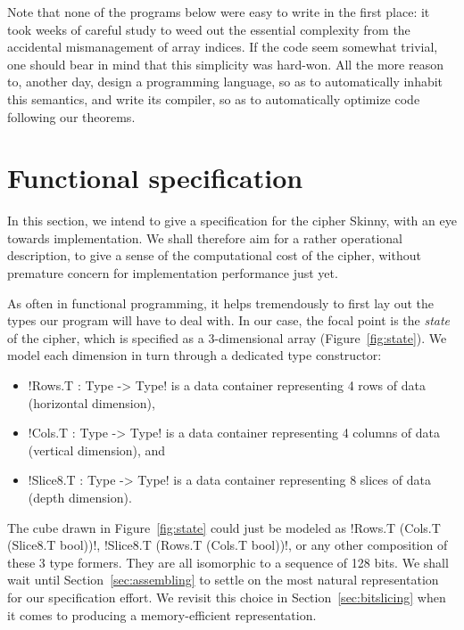 \documentclass[draft,english]{jflart}
\begin{document}
Note that none of the programs below were easy to write in the first
place: it took weeks of careful study to weed out the essential
complexity from the accidental mismanagement of array indices. If the
code seem somewhat trivial, one should bear in mind that this
simplicity was hard-won. All the more reason to, another day, design a
programming language, so as to automatically inhabit this semantics,
and write its compiler, so as to automatically optimize code following
our theorems.

\section{Functional specification}
\label{sec:spec}


In this section, we intend to give a specification for the cipher
Skinny, with an eye towards implementation. We shall therefore aim for
a rather operational description, to give a sense of the computational
cost of the cipher, without premature concern for implementation
performance just yet.


As often in functional programming, it helps tremendously to first lay
out the types our program will have to deal with. In our case, the
focal point is the \emph{state} of the cipher, which is specified as a
3-dimensional array (Figure~\ref{fig:state}). We model each dimension
in turn through a dedicated type constructor:
%
\begin{itemize}[nosep]
\item \coqe!Rows.T : Type -> Type! is a data container representing 4 rows of data (horizontal dimension),
\item \coqe!Cols.T : Type -> Type! is a data container representing 4 columns of data (vertical dimension), and
\item \coqe!Slice8.T : Type -> Type! is a data container representing
  8 slices of data (depth dimension).
\end{itemize}

The cube drawn in Figure~\ref{fig:state} could just be modeled as
%
\coqe!Rows.T (Cols.T (Slice8.T bool))!,
%
\coqe!Slice8.T (Rows.T (Cols.T bool))!,
%
or any other composition of these 3 type formers. They are all
isomorphic to a sequence of 128 bits. We shall wait until
Section~\ref{sec:assembling} to settle on the most natural
representation for our specification effort. We revisit this choice in
Section~\ref{sec:bitslicing} when it comes to producing a
memory-efficient representation.
\end{document}
